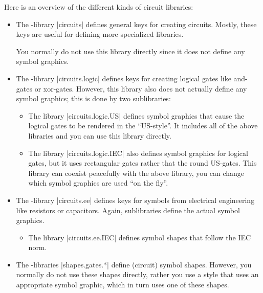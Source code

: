 Here is an overview of the different kinds of circuit libraries:
%
\begin{itemize}
    \item The \tikzname-library |circuits| defines general keys for creating
        circuits. Mostly, these keys are useful for defining more specialized
        libraries.

        You normally do not use this library directly since it does not define
        any symbol graphics.
    \item The \tikzname-library |circuits.logic| defines keys for creating
        logical gates like and-gates or xor-gates. However, this library also
        does not actually define any symbol graphics; this is done by two
        sublibraries:
        \begin{itemize}
            \item The library |circuits.logic.US| defines symbol graphics that
                cause the logical gates to be rendered in the ``US-style''. It
                includes all of the above libraries and you can use this
                library directly.
            \item The library |circuits.logic.IEC| also defines symbol graphics
                for logical gates, but it uses rectangular gates rather that
                the round US-gates. This library can coexist peacefully with
                the above library, you can change which symbol graphics are
                used ``on the fly''.
        \end{itemize}
    \item The \tikzname-library |circuits.ee| defines keys for symbols from
        electrical engineering like resistors or capacitors. Again,
        sublibraries define the actual symbol graphics.
        \begin{itemize}
            \item The library |circuits.ee.IEC| defines symbol shapes that
                follow the IEC norm.
        \end{itemize}
    \item The \pgfname-libraries |shapes.gates.*| define (circuit) symbol
        shapes. However, you normally do not use these shapes directly, rather
        you use a style that uses an appropriate symbol graphic, which in turn
        uses one of these shapes.
\end{itemize}

